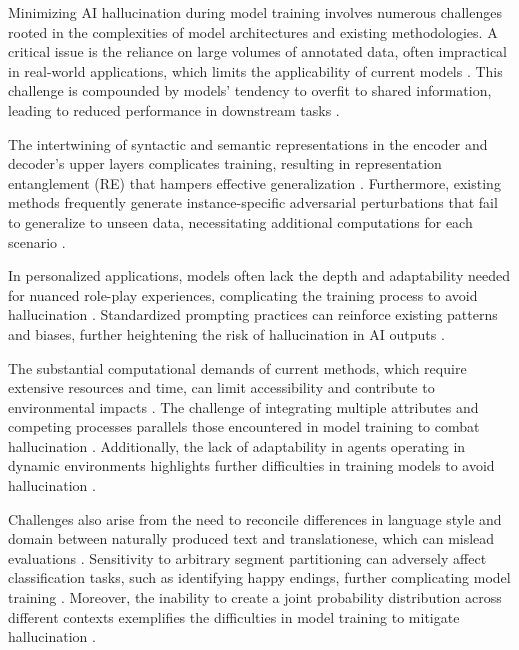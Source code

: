 Minimizing AI hallucination during model training involves numerous challenges rooted in the complexities of model architectures and existing methodologies. A critical issue is the reliance on large volumes of annotated data, often impractical in real-world applications, which limits the applicability of current models \cite{alayrac2022flamingo}. This challenge is compounded by models' tendency to overfit to shared information, leading to reduced performance in downstream tasks \cite{wang2022rethinkingminimalsufficientrepresentation}.

The intertwining of syntactic and semantic representations in the encoder and decoder's upper layers complicates training, resulting in representation entanglement (RE) that hampers effective generalization \cite{zheng2023layerwiserepresentationfusioncompositional}. Furthermore, existing methods frequently generate instance-specific adversarial perturbations that fail to generalize to unseen data, necessitating additional computations for each scenario \cite{zhang2024universaladversarialperturbationsvisionlanguage}.

In personalized applications, models often lack the depth and adaptability needed for nuanced role-play experiences, complicating the training process to avoid hallucination \cite{tao2024rolecraftglmadvancingpersonalizedroleplaying}. Standardized prompting practices can reinforce existing patterns and biases, further heightening the risk of hallucination in AI outputs \cite{palmini2024patternscreativityuserinput}.

The substantial computational demands of current methods, which require extensive resources and time, can limit accessibility and contribute to environmental impacts \cite{rombach2022high}. The challenge of integrating multiple attributes and competing processes parallels those encountered in model training to combat hallucination \cite{shakarian2022reasoningcomplexnetworkslogic}. Additionally, the lack of adaptability in agents operating in dynamic environments highlights further difficulties in training models to avoid hallucination \cite{le2019evolvingselfsupervisedneuralnetworks}.

Challenges also arise from the need to reconcile differences in language style and domain between naturally produced text and translationese, which can mislead evaluations \cite{bogoychev2020domaintranslationesenoisesynthetic}. Sensitivity to arbitrary segment partitioning can adversely affect classification tasks, such as identifying happy endings, further complicating model training \cite{jannidis2016analyzingfeaturesdetectionhappy}. Moreover, the inability to create a joint probability distribution across different contexts exemplifies the difficulties in model training to mitigate hallucination \cite{debarros2015examplescontextualityphysicsimplications}.


